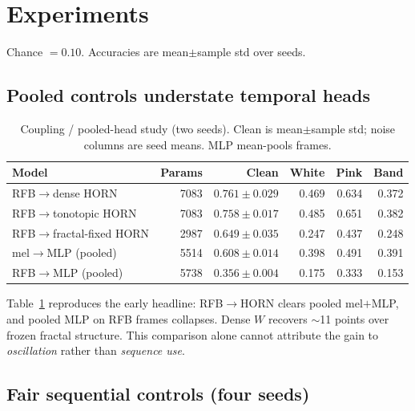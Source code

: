 \documentclass[11pt,a4paper]{article}
\begin{document}
\section{Experiments}
\label{sec:expts}

Chance $=0.10$. Accuracies are mean$\pm$sample std over seeds.

\subsection{Pooled controls understate temporal heads}
\label{sec:main}

\begin{table}[t]
\centering
\caption{Coupling / pooled-head study (two seeds). Clean is mean$\pm$sample
std; noise columns are seed means. MLP mean-pools frames.}
\label{tab:main}
\small
\begin{tabular}{@{}lrrrrr@{}}
\toprule
Model & Params & Clean & White & Pink & Band \\
\midrule
RFB$\to$dense HORN & 7083 & $0.761{\pm}0.029$ & 0.469 & 0.634 & 0.372 \\
RFB$\to$tonotopic HORN & 7083 & $0.758{\pm}0.017$ & 0.485 & 0.651 & 0.382 \\
RFB$\to$fractal-fixed HORN & 2987 & $0.649{\pm}0.035$ & 0.247 & 0.437 & 0.248 \\
mel$\to$MLP (pooled) & 5514 & $0.608{\pm}0.014$ & 0.398 & 0.491 & 0.391 \\
RFB$\to$MLP (pooled) & 5738 & $0.356{\pm}0.004$ & 0.175 & 0.333 & 0.153 \\
\bottomrule
\end{tabular}
\end{table}

Table~\ref{tab:main} reproduces the early headline: RFB$\to$HORN clears
pooled mel$+$MLP, and pooled MLP on RFB frames collapses. Dense $W$ recovers
$\sim$11 points over frozen fractal structure. This comparison alone cannot
attribute the gain to \emph{oscillation} rather than \emph{sequence use}.

\subsection{Fair sequential controls (four seeds)}
\label{sec:controls}
\end{document}
